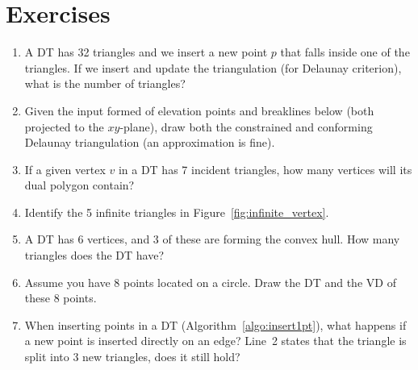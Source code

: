 %
\section{Exercises}

\begin{enumerate}
  \item A DT has 32 triangles and we insert a new point $p$ that falls inside one of the triangles. If we insert and update the triangulation (for Delaunay criterion), what is the number of triangles?
  \item Given the input formed of elevation points and breaklines below (both projected to the $xy$-plane), draw both the constrained and conforming Delaunay triangulation (an approximation is fine).  {}
  \item If a given vertex $v$ in a DT has 7 incident triangles, how many vertices will its dual polygon contain?
  \item Identify the 5 infinite triangles in Figure~\ref{fig:infinite_vertex}.
  \item A DT has 6 vertices, and 3 of these are forming the convex hull. How many triangles does the DT have?
  \item Assume you have 8 points located on a circle. Draw the DT and the VD of these 8 points.
  \item When inserting points in a DT (Algorithm~\ref{algo:insert1pt}), what happens if a new point is inserted directly on an edge? Line~2 states that the triangle is split into 3 new triangles, does it still hold?
\end{enumerate}
